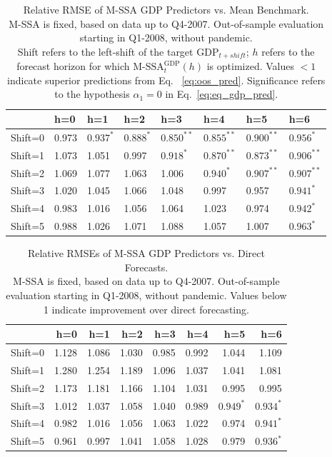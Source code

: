 \documentclass[11pt,a4paper]{article}
\begin{document}
\begin{table}[ht]
\caption{Relative RMSE of M-SSA GDP Predictors vs. Mean Benchmark.\\ 
M-SSA is fixed, based on data up to Q4-2007. Out-of-sample evaluation starting in Q1-2008, without pandemic.\\
Shift refers to the left-shift of the target $\textrm{GDP}_{t+shift}$; $h$ refers to the forecast horizon for which $\textrm{M-SSA}_t^{\textrm{GDP}}(h)$ is optimized. 
Values $< 1$ indicate superior predictions from Eq.~ \eqref{eq:oos_pred}. Significance refers to the hypothesis $\alpha_1=0$ in Eq.~\eqref{eq:eq_gdp_pred}.
} 
\label{tab:rRMSE_mSSA_comp_mean_wc}
\centering
\begin{tabular}{llllllll}
  \hline
 & h=0 & h=1 & h=2 & h=3 & h=4 & h=5 & h=6 \\ 
  \hline
Shift=0 & 0.973 & $0.937^*$ & $0.888^*$ & $0.850^{**}$ & $0.855^{**}$ & $0.900^{**}$ & $0.956^*$ \\ 
  Shift=1 & 1.073 & 1.051 & 0.997 & $0.918^*$ & $0.870^{**}$ & $0.873^{**}$ & $0.906^{**}$ \\ 
  Shift=2 & 1.069 & 1.077 & 1.063 & 1.006 & $0.940^*$ & $0.907^{**}$ & $0.907^{**}$ \\ 
  Shift=3 & 1.020 & 1.045 & 1.066 & 1.048 & 0.997 & 0.957 & $0.941^*$ \\ 
  Shift=4 & 0.983 & 1.016 & 1.056 & 1.064 & 1.023 & 0.974 & $0.942^*$ \\ 
  Shift=5 & 0.988 & 1.026 & 1.071 & 1.088 & 1.057 & 1.007 & $0.963^*$ \\ 
   \hline
\end{tabular}
\end{table}




\begin{table}[ht]
\caption{Relative RMSEs of M-SSA GDP Predictors vs. Direct Forecasts.\\ 
M-SSA is fixed, based on data up to Q4-2007. Out-of-sample evaluation starting in Q1-2008, without pandemic. 
Values below 1 indicate improvement over direct forecasting.
\label{tab:rRMSE_mSSA_comp_direct_without_covid7}}
\centering
\begin{tabular}{rrrrrrrr}
  \hline
 & h=0 & h=1 & h=2 & h=3 & h=4 & h=5 & h=6 \\ 
  \hline
Shift=0 & 1.128 & 1.086 & 1.030 & 0.985 & 0.992 & 1.044 & 1.109 \\ 
  Shift=1 & 1.280 & 1.254 & 1.189 & 1.096 & 1.037 & 1.041 & 1.081 \\ 
  Shift=2 & 1.173 & 1.181 & 1.166 & 1.104 & 1.031 & 0.995 & 0.995 \\ 
  Shift=3 & 1.012 & 1.037 & 1.058 & 1.040 & 0.989 & $0.949^*$ & $0.934^*$ \\ 
  Shift=4 & 0.982 & 1.016 & 1.056 & 1.063 & 1.022 & 0.974 & $0.941^*$ \\ 
  Shift=5 & 0.961 & 0.997 & 1.041 & 1.058 & 1.028 & 0.979 & $0.936^{*}$ \\ 
  \hline
\end{tabular}
\end{table}
\end{document}
